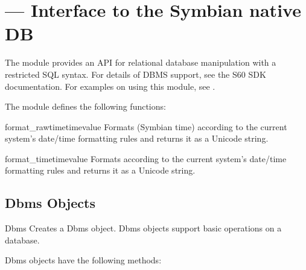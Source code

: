 %
%
%

\section{ ---
  Interface to the Symbian native DB}
\label{sec:e32db}


\label{sec:mylabel3}
The  module provides an API for relational database 
manipulation with a restricted SQL syntax. For details of DBMS support, see 
the S60 SDK documentation. For examples on using this module, see \cite{PyS60Prog}.

The  module defines the following functions:

\begin{funcdesc}{format_rawtime}{timevalue}
Formats  (Symbian time) according to the current 
system's date/time formatting rules and returns it as a Unicode string.
\end{funcdesc}

\begin{funcdesc}{format_time}{timevalue}
Formats  according to the current system's date/time 
formatting rules and returns it as a Unicode string.
\end{funcdesc}

\subsection{Dbms Objects}
\label{subsec:mylabel13}

\begin{classdesc}{Dbms}{}
Creates a Dbms object. Dbms objects support basic 
operations on a database. 
\end{classdesc}

Dbms objects have the following methods:

